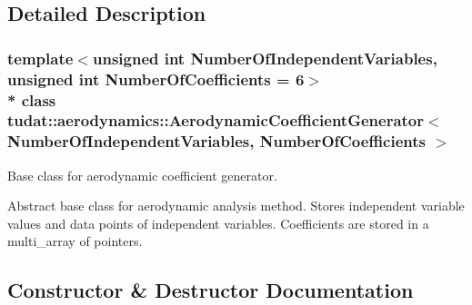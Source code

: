 \subsection{Detailed Description}
\subsubsection*{template$<$unsigned int Number\+Of\+Independent\+Variables, unsigned int Number\+Of\+Coefficients = 6$>$\\*
class tudat\+::aerodynamics\+::\+Aerodynamic\+Coefficient\+Generator$<$ Number\+Of\+Independent\+Variables, Number\+Of\+Coefficients $>$}

Base class for aerodynamic coefficient generator. 

Abstract base class for aerodynamic analysis method. Stores independent variable values and data points of independent variables. Coefficients are stored in a multi\+\_\+array of pointers. 

\subsection{Constructor \& Destructor Documentation}

